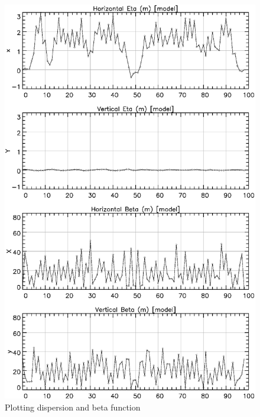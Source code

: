 \begin{figure}
  \centering
  \includegraphics[width=5in]{plot_eta_beta.eps}
  \caption{Plotting dispersion and beta function}
  \label{f:plot_eta_beta}
\end{figure}

